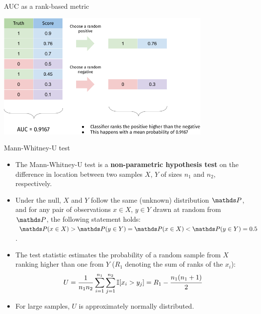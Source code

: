 \documentclass[11pt,compress,t,notes=noshow, xcolor=table]{beamer}
\begin{document}
\begin{vbframe}{AUC as a rank-based metric}
\begin{center}
  \includegraphics[width=0.8\textwidth]{figure_man/auc_interpretation_new}
\end{center}

\end{vbframe}


\begin{vbframe}{Mann-Whitney-U test}

\begin{itemize}
  \item The Mann-Whitney-U test is a \textbf{non-parametric hypothesis test} on 
  the difference in location between two samples $X$, $Y$ of sizes $n_1$ and 
  $n_2$, respectively.
  \item Under the null, $X$ and $Y$ follow the same (unknown) distribution $\P$, 
  and for any pair of observations $x \in X$, $y \in Y$ drawn at random from 
  $\P$, the following statement holds:
  $\P(x \in X) > \P(y \in Y) = \P(x \in X) < \P(y \in Y) = 0.5$.
  \item The test statistic estimates the probability of a random sample from $X$
  ranking higher than one from $Y$ ($R_1$ denoting the sum of 
  ranks of the $x_i$):
  \begin{equation*}
      U = \frac{1}{n_1 n_2} \sum_{i = 1}^{n_1} \sum_{j = 1}^{n_2} 
      \mathbb{I}[x_i > y_j]
      = R_1 - \cfrac{n_1(n_1 + 1)}{2}
  \end{equation*}
  \item For large samples, $U$ is approximately normally distributed.
\end{itemize}

\end{vbframe}
\end{document}
